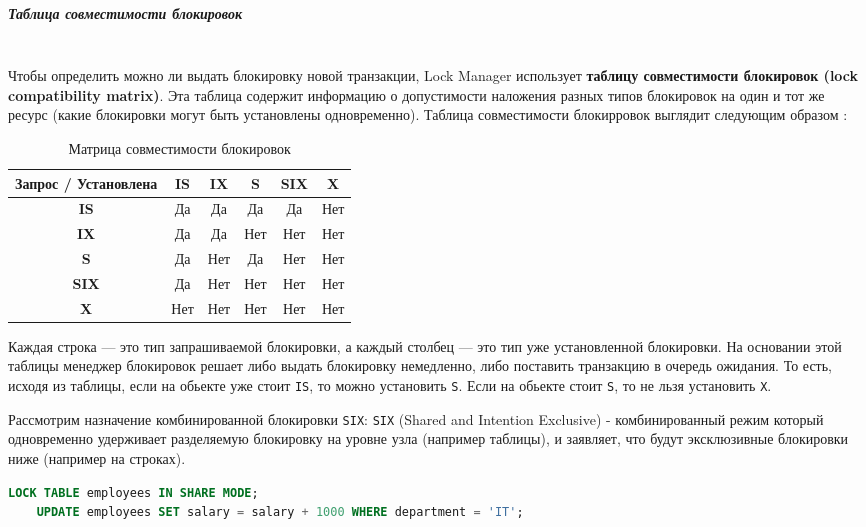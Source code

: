 \subparagraph{Таблица совместимости блокировок} ~\\
 Чтобы определить можно ли выдать блокировку новой транзакции, Lock Manager использует \textbf{таблицу совместимости блокировок (lock compatibility matrix)}. Эта таблица содержит информацию о допустимости наложения разных типов блокировок на один и тот же ресурс (какие блокировки могут быть установлены одновременно). Таблица совместимости блокирровок выглядит следующим образом \autocite{Silberschatz}:
 
 \begin{table}[H]
    \centering
    \begin{tabular}{|c|c|c|c|c|c|}
        \hline
        \textbf{Запрос / Установлена} & \textbf{IS} & \textbf{IX} & \textbf{S} & \textbf{SIX} & \textbf{X} \\
        \hline
        \textbf{IS} & Да & Да & Да & Да & Нет \\
        \hline
        \textbf{IX} & Да & Да & Нет & Нет & Нет \\
        \hline
        \textbf{S} & Да & Нет & Да & Нет & Нет \\
        \hline
        \textbf{SIX} & Да & Нет & Нет & Нет & Нет \\
        \hline
        \textbf{X} & Нет & Нет & Нет & Нет & Нет \\
        \hline
    \end{tabular}
    \caption{Матрица совместимости блокировок}
 \end{table}

 Каждая строка — это тип запрашиваемой блокировки, а каждый столбец — это тип уже установленной блокировки.
 На основании этой таблицы менеджер блокировок решает либо выдать блокировку немедленно, либо поставить транзакцию в очередь ожидания.
 То есть, исходя из таблицы, если на обьекте уже стоит \texttt{IS}, то можно установить \texttt{S}. Если на обьекте стоит \texttt{S}, то не льзя установить \texttt{X}.

 Рассмотрим назначение комбинированной блокировки \texttt{SIX}:
 \texttt{SIX} (Shared and Intention Exclusive) - комбинированный режим который одновременно удерживает разделяемую блокировку на уровне узла (например таблицы), и заявляет, что будут эксклюзивные блокировки ниже (например на строках).
 \begin{lstlisting}[language=SQL]
    LOCK TABLE employees IN SHARE MODE;
    UPDATE employees SET salary = salary + 1000 WHERE department = 'IT';   
 \end{lstlisting}

